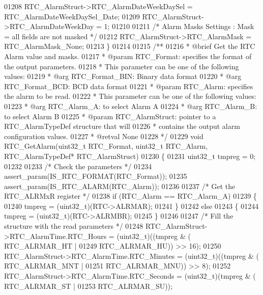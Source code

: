\begin{DoxyCode}
01208   RTC\_AlarmStruct->RTC_AlarmDateWeekDaySel = RTC_AlarmDateWeekDaySel_Date;
01209   RTC\_AlarmStruct->RTC_AlarmDateWeekDay = 1;
01210 
01211   \textcolor{comment}{/* Alarm Masks Settings : Mask =  all fields are not masked */}
01212   RTC\_AlarmStruct->RTC_AlarmMask = RTC_AlarmMask_None;
01213 \}
01214 
01215 \textcolor{comment}{/**}
01216 \textcolor{comment}{  * @brief  Get the RTC Alarm value and masks.}
01217 \textcolor{comment}{  * @param  RTC\_Format: specifies the format of the output parameters.}
01218 \textcolor{comment}{  *          This parameter can be one of the following values:}
01219 \textcolor{comment}{  *            @arg RTC\_Format\_BIN: Binary data format }
01220 \textcolor{comment}{  *            @arg RTC\_Format\_BCD: BCD data format}
01221 \textcolor{comment}{  * @param  RTC\_Alarm: specifies the alarm to be read.}
01222 \textcolor{comment}{  *          This parameter can be one of the following values:}
01223 \textcolor{comment}{  *            @arg RTC\_Alarm\_A: to select Alarm A}
01224 \textcolor{comment}{  *            @arg RTC\_Alarm\_B: to select Alarm B  }
01225 \textcolor{comment}{  * @param  RTC\_AlarmStruct: pointer to a RTC\_AlarmTypeDef structure that will }
01226 \textcolor{comment}{  *                          contains the output alarm configuration values.     }
01227 \textcolor{comment}{  * @retval None}
01228 \textcolor{comment}{  */}
01229 \textcolor{keywordtype}{void} RTC_GetAlarm(uint32\_t RTC\_Format, uint32\_t RTC\_Alarm, RTC\_AlarmTypeDef* RTC\_AlarmStruct)
01230 \{
01231   uint32\_t tmpreg = 0;
01232 
01233   \textcolor{comment}{/* Check the parameters */}
01234   assert_param(IS\_RTC\_FORMAT(RTC\_Format));
01235   assert_param(IS\_RTC\_ALARM(RTC\_Alarm));
01236 
01237   \textcolor{comment}{/* Get the RTC\_ALRMxR register */}
01238   \textcolor{keywordflow}{if} (RTC\_Alarm == RTC_Alarm_A)
01239   \{
01240     tmpreg = (uint32\_t)(RTC->ALRMAR);
01241   \}
01242   \textcolor{keywordflow}{else}
01243   \{
01244     tmpreg = (uint32\_t)(RTC->ALRMBR);
01245   \}
01246 
01247   \textcolor{comment}{/* Fill the structure with the read parameters */}
01248   RTC\_AlarmStruct->RTC_AlarmTime.RTC_Hours = (uint32\_t)((tmpreg & (
      RTC_ALRMAR_HT |
01249                                                      RTC_ALRMAR_HU)) >> 16);
01250   RTC\_AlarmStruct->RTC_AlarmTime.RTC_Minutes = (uint32\_t)((tmpreg & (
      RTC_ALRMAR_MNT |
01251                                                      RTC_ALRMAR_MNU)) >> 8);
01252   RTC\_AlarmStruct->RTC_AlarmTime.RTC_Seconds = (uint32\_t)(tmpreg & (
      RTC_ALRMAR_ST |
01253                                                      RTC_ALRMAR_SU));

\end{DoxyCode}
